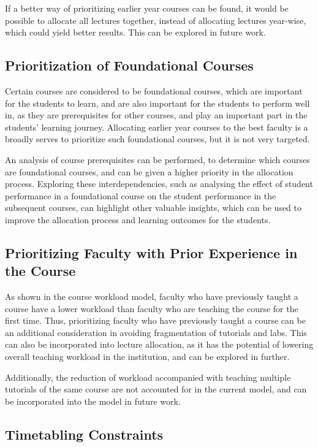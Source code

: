 If a better way of prioritizing earlier year courses can be found, it would be possible to allocate all lectures together, instead of allocating lectures year-wise, which could yield better results. This can be explored in future work.

\subsection{Prioritization of Foundational Courses}

Certain courses are considered to be foundational courses, which are important for the students to learn, and are also important for the students to perform well in, as they are prerequisites for other courses, and play an important part in the students' learning journey. Allocating earlier year courses to the best faculty is a broadly serves to prioritize such foundational courses, but it is not very targeted.

An analysis of course prerequisites can be performed, to determine which courses are foundational courses, and can be given a higher priority in the allocation process. Exploring these interdependencies, such as analysing the effect of student performance in a foundational course on the student performance in the subsequent courses, can highlight other valuable insights, which can be used to improve the allocation process and learning outcomes for the students.

\subsection{Prioritizing Faculty with Prior Experience in the Course}

As shown in the course workload model, faculty who have previously taught a course have a lower workload than faculty who are teaching the course for the first time. Thus, prioritizing faculty who have previously taught a course can be an additional consideration in avoiding fragmentation of tutorials and labs. This can also be incorporated into lecture allocation, as it has the potential of lowering overall teaching workload in the institution, and can be explored in further.

Additionally, the reduction of workload accompanied with teaching multiple tutorials of the same course are not accounted for in the current model, and can be incorporated into the model in future work.

\subsection{Timetabling Constraints}

